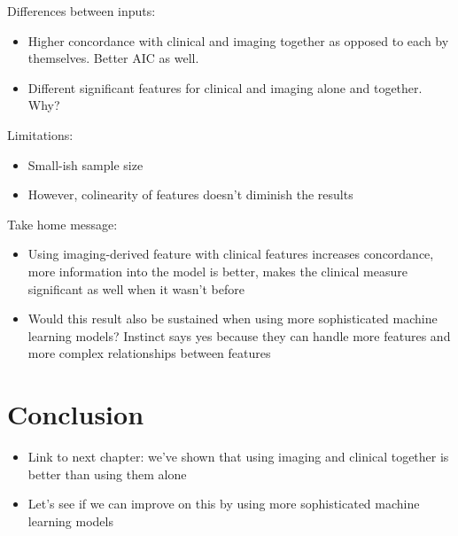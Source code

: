 Differences between inputs:
\begin{itemize}
    \item Higher concordance with clinical and imaging together as opposed to each by themselves. Better AIC as well.
    \item Different significant features for clinical and imaging alone and together. Why?
\end{itemize}

Limitations:
\begin{itemize}
    \item Small-ish sample size
    \item However, colinearity of features doesn't diminish the results
\end{itemize}

Take home message:
\begin{itemize}
    \item Using imaging-derived feature with clinical features increases concordance, more information into the model is better, makes the clinical measure significant as well when it wasn't before
    \item Would this result also be sustained when using more sophisticated machine learning models? Instinct says yes because they can handle more features and more complex relationships between features
\end{itemize}

\section{Conclusion}
\begin{itemize}
    \item Link to next chapter: we've shown that using imaging and clinical together is better than using them alone
    \item Let's see if we can improve on this by using more sophisticated machine learning models
\end{itemize}
